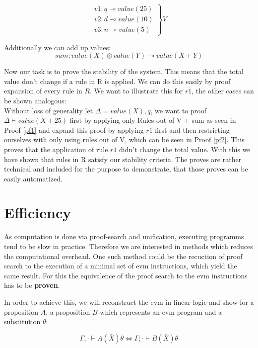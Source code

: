 \documentclass[sigconf]{acmart}
\begin{document}
\[ \left.
\begin{array}{l}
  v1: q\multimap value(25) \\
  v2: d\multimap value(10) \\
  v3: n\multimap value(5)
\end{array}
\right\} V \]

Additionally we can add up values:
\[ sum: value(X)\otimes value(Y)\multimap value(X + Y) \]

Now our task is to prove the stability of the system. This means that the total value don't change if a rule in R is applied. We can do this easily by proof expansion of every rule in $R$.
We want to illustrate this for $r1$, the other cases can be shown analogous:
\\
Without loss of generality let $\Delta = value(X), q$, we want to proof $\Delta \vdash value(X + 25)$ first by applying only Rules out of V + sum as seen in Proof \ref{pf1} and expand this proof by applying $r1$ first and then restricting ourselves with only using rules out of V, which can be seen in Proof \ref{pf2}. This proves that the application of rule $r1$ didn't change the total value.
With this we have shown that rules in R satisfy our stability criteria.
The proves are rather technical and included for the purpose to demonstrate, that those proves can be easily automatized.

\section{Efficiency}
As computation is done via proof-search and unification, executing programms tend to be slow in practice. Therefore we are interested in methods which reduces the computational overhead. One such method could be the recuction of proof search to the execution of a minimal set of evm instructions, which yield the same result. For this the equivalence of the proof search to the evm instructions has to be \textbf{proven}.

In order to achieve this, we will reconstruct the evm in linear logic and show for a proposition $A$, a proposition $B$ which represents an evm program and a substitution $\theta$:

\[ \Gamma; \cdot \vdash A(\bar X)\theta \Leftrightarrow \Gamma; \cdot \vdash B(\bar X)\theta \]

\end{document}
